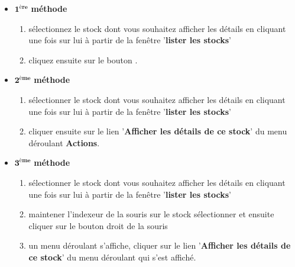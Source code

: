 \begin{itemize}[]
	\item \textcolor{purplish}{$\mathbf{1^{\text{\`ere}}}$ \textbf{m\'ethode}}
		\begin{enumerate}[1)]
			\item s\'electionnez le stock dont vous souhaitez
			afficher les d\'etails en cliquant une fois sur lui
			\` a partir de la fen\^etre '\textbf{lister les stocks}'
			
			\item cliquez ensuite sur le bouton .	\\
		\end{enumerate}
	
	\item \textcolor{purplish}{$\mathbf{2^{\text{\`eme}}}$ \textbf{m\'ethode}}
		\begin{enumerate}[1)]
			\item s\'electionner le stock dont vous souhaitez
			afficher les d\'etails en cliquant une fois sur lui
			\` a partir de la fen\^etre '\textbf{lister les stocks}'
			
			\item cliquer ensuite sur le lien '\textbf{Afficher les d\'etails de ce stock}'
			du menu d\'eroulant \textbf{Actions}.\\
		\end{enumerate}
	
	\item \textcolor{purplish}{$\mathbf{3^{\text{\`eme}}}$ \textbf{m\'ethode}}
		\begin{enumerate}[1)]
			\item s\'electionner le stock dont vous souhaitez
			afficher les d\'etails en cliquant une fois sur lui
			\` a partir de la fen\^etre '\textbf{lister les stocks}'
			
			\item maintener l'indexeur de la souris sur le stock
				s\'electionner et ensuite cliquer sur le bouton
				droit de la souris
			
			\item un menu d\'eroulant s'affiche, cliquer sur
				le lien '\textbf{Afficher les d\'etails de ce stock}' du
				menu d\'eroulant qui s'est affich\'e. 
		\end{enumerate}
\end{itemize}

\newpage
{}



